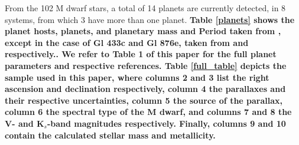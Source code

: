 \documentclass[structabstract]{aa}
\begin{document}
From the 102 M dwarf stars, a total of 14 planets are currently detected, in 8 systems, from which 3 have more than one planet.\textbf{ Table \ref{planets} shows the planet hosts, planets, and planetary mass and Period taken from \citet{Bonfils-2011}, except in the case of Gl 433c and Gl 876e, taken from \citet{Delfosse-2012} and \citet{Rivera-2010} respectively.. We refer to Table 1 of this paper for the full planet parameters and respective references. Table \ref{full_table} depicts the sample used in this paper, where columns 2 and 3 list the right ascension and declination respectively, column 4 the parallaxes and their respective uncertainties, column 5 the source of the parallax, column 6 the spectral type of the M dwarf, and columns 7 and 8 the V- and K$_{s}$-band magnitudes respectively. Finally, columns 9 and 10 contain the calculated stellar mass and metallicity.}

\end{document}
